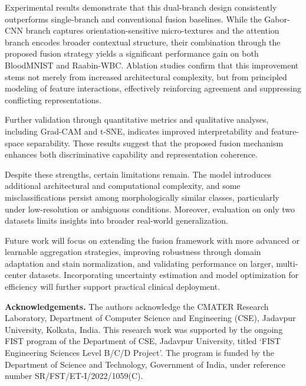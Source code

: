 \documentclass[12pt]{article}
\begin{document}
Experimental results demonstrate that this dual-branch design consistently outperforms single-branch and conventional fusion baselines. While the Gabor-CNN branch captures orientation-sensitive micro-textures and the attention branch encodes broader contextual structure, their combination through the proposed fusion strategy yields a significant performance gain on both BloodMNIST and Raabin-WBC. Ablation studies confirm that this improvement stems not merely from increased architectural complexity, but from principled modeling of feature interactions, effectively reinforcing agreement and suppressing conflicting representations.

Further validation through quantitative metrics and qualitative analyses, including Grad-CAM and t-SNE, indicates improved interpretability and feature-space separability. These results suggest that the proposed fusion mechanism enhances both discriminative capability and representation coherence.

Despite these strengths, certain limitations remain. The model introduces additional architectural and computational complexity, and some misclassifications persist among morphologically similar classes, particularly under low-resolution or ambiguous conditions. Moreover, evaluation on only two datasets limits insights into broader real-world generalization.

Future work will focus on extending the fusion framework with more advanced or learnable aggregation strategies, improving robustness through domain adaptation and stain normalization, and validating performance on larger, multi-center datasets. Incorporating uncertainty estimation and model optimization for efficiency will further support practical clinical deployment.

\textbf{Acknowledgements.} The authors acknowledge the CMATER Research Laboratory, Department of Computer Science and Engineering (CSE), Jadavpur University, Kolkata, India. This research work was supported by the ongoing FIST program of the Department of CSE, Jadavpur University, titled ‘FIST Engineering Sciences Level B/C/D Project’. The program is funded by the Department of Science and Technology, Government of India, under reference number SR/FST/ET-I/2022/1059(C).
\end{document}

